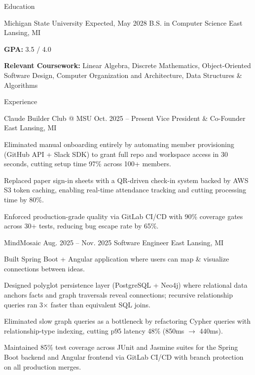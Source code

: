\documentclass[
	11pt
]{../../resume}
\begin{document}
	\begin{rSection}{E}{ducation}
		\begin{rSectionEntry}
			{Michigan State University}
			{Expected, May 2028}
			{B.S. in Computer Science}
			{}
			{East Lansing, MI}

			\item \textbf{GPA:} 3.5 / 4.0
			\item \textbf{Relevant Coursework:} Linear Algebra, Discrete Mathematics, Object-Oriented Software Design, Computer Organization and Architecture, Data Structures \& Algorithms
		\end{rSectionEntry}
	\end{rSection}

	\begin{rSection}{E}{xperience}
		\begin{rSectionEntry}
			{Claude Builder Club @ MSU}
			{Oct. 2025 -- Present}
			{Vice President \& Co-Founder}
			{}
			{East Lansing, MI}

			\item Eliminated manual onboarding entirely by automating member provisioning (GitHub API + Slack SDK) to grant full repo and workspace access in 30 seconds, cutting setup time 97\% across 100+ members.
			\item Replaced paper sign-in sheets with a QR-driven check-in system backed by AWS S3 token caching, enabling real-time attendance tracking and cutting processing time by 80\%.
			\item Enforced production-grade quality via GitLab CI/CD with 90\% coverage gates across 30+ tests, reducing bug escape rate by 65\%.
		\end{rSectionEntry}

		\begin{rSectionEntry}
			{MindMosaic}
			{Aug. 2025 -- Nov. 2025}
			{Software Engineer}
			{}
			{East Lansing, MI}

			\item Built Spring Boot + Angular application where users can map \& visualize connections between ideas.
			\item Designed polyglot persistence layer (PostgreSQL + Neo4j) where relational data anchors facts and graph traversals reveal connections; recursive relationship queries ran 3$\times$ faster than equivalent SQL joins.
			\item Eliminated slow graph queries as a bottleneck by refactoring Cypher queries with relationship-type indexing, cutting p95 latency 48\% (850ms $\rightarrow$ 440ms).
			\item Maintained 85\% test coverage across JUnit and Jasmine suites for the Spring Boot backend and Angular frontend via GitLab CI/CD with branch protection on all production merges.
		\end{rSectionEntry}
	\end{rSection}
\end{document}
